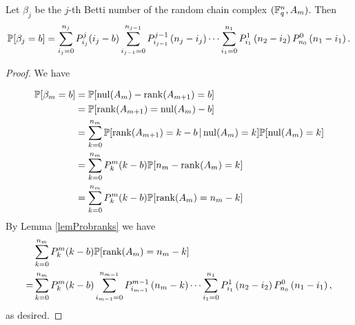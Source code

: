 \begin{theorem} Let $\beta_j$ be the $j$-th Betti number of the random chain complex $(\mathbb{F}_q^{n} , A_m)$. Then
	\[    
    \mathbb{P}[\beta_j = b] = \sum_{i_j=0}^{n_{j}} P_{i_j}^{j}(i_j-b)
    \sum_{i_{j-1}=0}^{n_{j-1}} P_{i_{j-1}}^{j-1}\left(n_{j} -i_j\right)
		\cdots
	\sum_{i_1 = 0}^{n_1} P_{i_1}^1\left(n_2 - i_2\right) P_{n_0}^0 \left(n_1 - i_1\right).
    \]
\end{theorem}

\begin{proof}
We have

\begin{align*}
  \mathbb{P}[\beta_{m} = b] 
   &= \mathbb{P}[\mathrm{nul}(A_{m}) - \operatorname{\mathrm{rank}}(A_{m+1}) = b]\\
   &= \mathbb{P}[\operatorname{\mathrm{rank}}(A_{m+1}) = \mathrm{nul}(A_{m}) - b]\\
   &= \sum_{k=0}^{n_{m}}\mathbb{P}[\operatorname{\mathrm{rank}}(A_{m+1}) = k - b\,|\, \mathrm{nul}(A_{m})=k] \mathbb{P}[\mathrm{nul}(A_{m}) = k]\\
   &= \sum_{k=0}^{n_{m}} P_{k}^{m}(k-b)\mathbb{P}[n_{m} - \operatorname{\mathrm{rank}}(A_{m}) = k]\\
   &= \sum_{k=0}^{n_{m}} P_{k}^{m}(k-b)\mathbb{P}[\operatorname{\mathrm{rank}}(A_{m}) = n_{m} - k]\\ 
\end{align*}
By Lemma \ref{lemProbranks} we have
\begin{align*}
 & \sum_{k=0}^{n_{m}} P_{k}^{m}(k-b)\mathbb{P}[\operatorname{\mathrm{rank}}(A_{m}) = n_{m} - k] \\
=& \sum_{k=0}^{n_{m}} P_{k}^{m}(k-b)\sum_{i_{m-1}=0}^{n_{m-1}} P_{i_{m-1}}^{m-1}\left(n_{m} -k\right)
		\cdots
	\sum_{i_1 = 0}^{n_1} P_{i_1}^1\left(n_2 - i_2\right) P_{n_0}^0 \left(n_1 - i_1\right), 
\end{align*}
as desired.
\end{proof}
